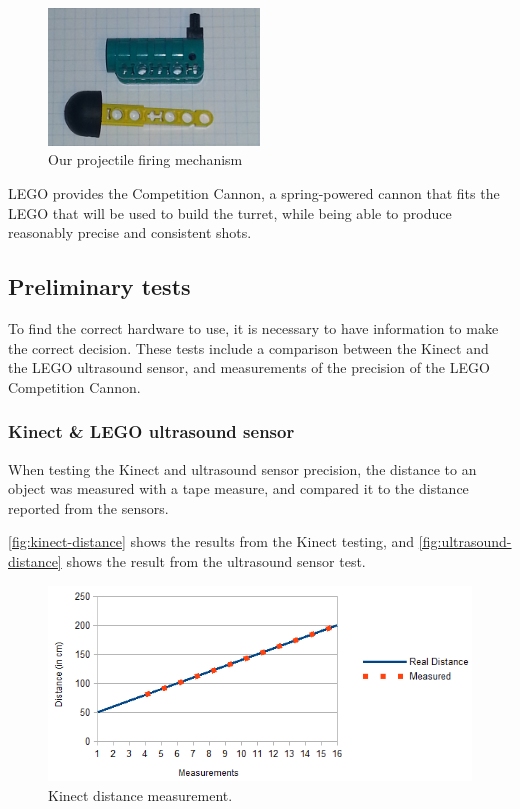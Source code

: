 \begin{figure}[hptb]
  \centering
    \includegraphics[width=0.5\textwidth]{img/competition_cannon.png}
  \caption{Our projectile firing mechanism}
  \label{competition_cannon}
\end{figure}

LEGO provides the Competition Cannon, a spring-powered cannon that fits the LEGO that will be used to build the turret, while being able to produce reasonably precise and consistent shots.

\subsection{Preliminary tests}
To find the correct hardware to use, it is necessary to have information to make the correct decision. These tests include a comparison between the Kinect and the LEGO ultrasound sensor, and measurements of the precision of the LEGO Competition Cannon.

\subsubsection{Kinect \& LEGO ultrasound sensor}
When testing the Kinect and ultrasound sensor precision, the distance to an object was measured with a tape measure, and compared it to the distance reported from the sensors.

\autoref{fig:kinect-distance} shows the results from the Kinect testing, and \autoref{fig:ultrasound-distance} shows the result from the ultrasound sensor test.

\begin{figure}[hbtp]
\includegraphics[width=\textwidth]{img/kinect-distance.png}
\caption{Kinect distance measurement.} 
\label{fig:kinect-distance} 
\end{figure}

